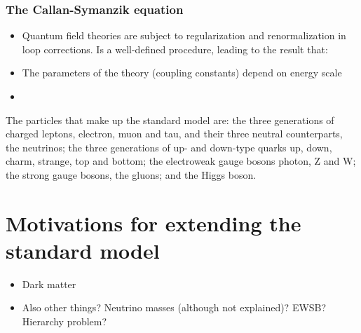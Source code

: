 \documentclass[twoside,english]{uiofysmaster}
\begin{document}
\subsubsection{The Callan-Symanzik equation}


\begin{itemize}
	\item Quantum field theories are subject to regularization and renormalization in loop corrections. Is a well-defined procedure, leading to the result that:
	\item The parameters of the theory (coupling constants) depend on energy scale
	\item 
\end{itemize}



The particles that make up the standard model are: the three generations of charged leptons, electron, muon and tau, and their three neutral counterparts, the neutrinos; the three generations of up- and down-type quarks up, down, charm, strange, top and bottom; the electroweak gauge bosons photon, Z and W; the strong gauge bosons, the gluons; and the Higgs boson. 

\section{Motivations for extending the standard model}
\begin{itemize}
	\item Dark matter
	\item Also other things? Neutrino masses (although not explained)? EWSB? Hierarchy problem? 
\end{itemize}
\end{document}
